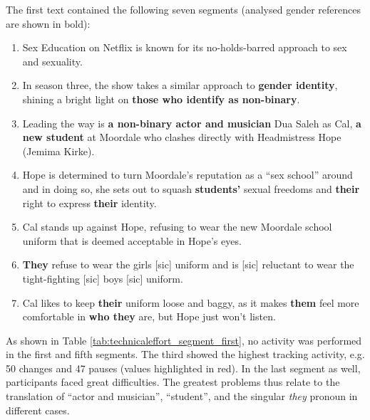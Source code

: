The first text contained the following seven segments (analysed gender references are shown in bold):
\begin{enumerate}
\setlength\itemsep{-0.5em}
    \item Sex Education on Netflix is known for its no-holds-barred approach to sex and sexuality.
    \item In season three, the show takes a similar approach to \textbf{gender identity}, shining a bright light on \textbf{those who identify as non-binary}.
    \item Leading the way is \textbf{a non-binary actor and musician} Dua Saleh as Cal, \textbf{a new student} at Moordale who clashes directly with Headmistress Hope (Jemima Kirke).
    \item Hope is determined to turn Moordale's reputation as a ``sex school'' around and in doing so, she sets out to squash \textbf{students'} sexual freedoms and \textbf{their} right to express \textbf{their} identity.
    \item Cal stands up against Hope, refusing to wear the new Moordale school uniform that is deemed acceptable in Hope's eyes. 
    \item \textbf{They} refuse to wear the girls [sic] uniform and is [sic] reluctant to wear the tight-fighting [sic] boys [sic] uniform. 
    \item Cal likes to keep \textbf{their} uniform loose and baggy, as it makes \textbf{them} feel more comfortable in \textbf{who they} are, but Hope just won't listen.
\end{enumerate}


As shown in Table \ref{tab:technicaleffort_segment_first}, no activity was performed in the first and fifth segments. The third showed the highest tracking activity, e.g. 50 changes and 47 pauses (values highlighted in red). In the last segment as well, participants faced great difficulties. The greatest problems thus relate to the translation of ``actor and musician'', ``student'', and the singular \textit{they} pronoun in different cases. 

